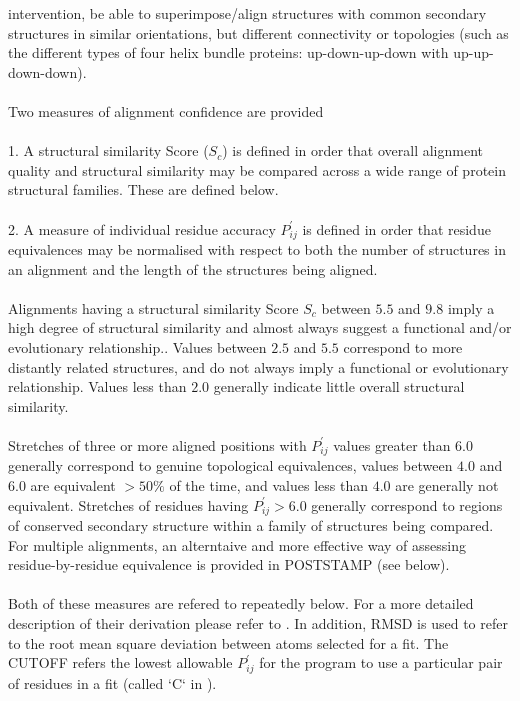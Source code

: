 intervention,  be able to superimpose/align structures with common
secondary structures in similar orientations, but different
connectivity or topologies (such as the different types of four helix bundle
proteins: up-down-up-down with up-up-down-down).  \\
\\
Two measures of alignment confidence are provided \cite{rb92b}\\
\\
1. A structural similarity Score ($S_{c}$) is defined in order that
overall alignment quality and structural similarity may be compared
across a wide range of protein structural families.  These are defined below.\\
\\
2. A measure of individual residue accuracy $P_{ij}^{\prime}$ is 
defined in order that residue equivalences may be normalised with 
respect to both the number of structures in an alignment and the 
length of the structures being aligned.\\
\\
Alignments having a structural similarity Score $S_{c}$ between $5.5$ and
$9.8$ imply a high degree of structural similarity and almost always
suggest a functional and/or evolutionary relationship.. 
Values between $2.5$ and $5.5$ correspond to more distantly related
structures, and do not always imply a functional or evolutionary relationship.
Values less than $2.0$ generally indicate little overall structural similarity.\\
\\
Stretches of three or more aligned positions with $P_{ij}^{\prime}$ 
values greater than $6.0$ generally correspond to genuine topological 
equivalences, values between $4.0$ and $6.0$ are equivalent $> 50 \%$ of 
the time, and values less than $4.0$ are generally not equivalent.  
Stretches of residues having $P_{ij}^{\prime} > 6.0$ generally correspond to regions of 
conserved secondary structure within a family of structures being 
compared.  For multiple alignments, an alterntaive and more effective
way of assessing residue-by-residue equivalence is provided in POSTSTAMP (see below).\\
\\
Both of these measures are refered to repeatedly below.  For a more
detailed description of their derivation please refer to \cite{rb92b}.  
In addition, RMSD is used to refer to the root mean square 
deviation between atoms selected for a fit.  The CUTOFF refers the 
lowest allowable $P_{ij}^{\prime}$ for the program to use a particular 
pair of residues in a fit (called `C` in \cite{rb92b}).

